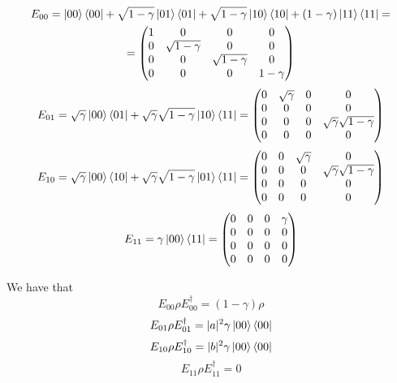 \documentclass{masterthesis}
\begin{document}
\begin{multline}\label{eq:op-el-1}
    E_{00} = \ket{00}\bra{00} + \sqrt{1-\gamma}\ket{01}\bra{01} + \sqrt{1-\gamma}\ket{10}\bra{10} + (1-\gamma)\ket{11}\bra{11} = \\
    = \begin{pmatrix} 1 & 0 & 0 & 0 \\ 0 & \sqrt{1-\gamma} & 0 & 0 \\ 0 & 0 & \sqrt{1-\gamma} & 0 \\ 0 & 0 & 0 & 1-\gamma \end{pmatrix}
\end{multline}
\begin{equation}\label{eq:op-el-2}
    E_{01} = \sqrt{\gamma}\ket{00}\bra{01} + \sqrt{\gamma}\sqrt{1-\gamma}\ket{10}\bra{11}
    = \begin{pmatrix} 0 & \sqrt{\gamma} & 0 & 0 \\ 0 & 0 & 0 & 0 \\ 0 & 0 & 0 & \sqrt{\gamma}\sqrt{1-\gamma} \\ 0 & 0 & 0 & 0 \end{pmatrix}
\end{equation}
\begin{equation}\label{eq:op-el-3}
    E_{10} = \sqrt{\gamma}\ket{00}\bra{10} + \sqrt{\gamma}\sqrt{1-\gamma}\ket{01}\bra{11}  
    = \begin{pmatrix} 0 & 0 & \sqrt{\gamma} & 0 \\ 0 & 0 & 0 & \sqrt{\gamma}\sqrt{1-\gamma} \\ 0 & 0 & 0 & 0 \\ 0 & 0 & 0 & 0 \end{pmatrix}
\end{equation}
\begin{equation}\label{eq:op-el-4}
    E_{11} = \gamma \ket{00}\bra{11}
    = \begin{pmatrix} 0 & 0 & 0 & \gamma \\ 0 & 0 & 0 & 0 \\ 0 & 0 & 0 & 0 \\ 0 & 0 & 0 & 0 \end{pmatrix}
\end{equation}

We have that
\begin{equation}
    E_{00} \rho E_{00}^{\dagger} = (1-\gamma) \rho
\end{equation}
\begin{equation}
    E_{01} \rho E_{01}^{\dagger} = |a|^2 \gamma \ket{00}\bra{00}
\end{equation}
\begin{equation}
    E_{10} \rho E_{10}^{\dagger} = |b|^2 \gamma \ket{00}\bra{00}
\end{equation}
\begin{equation}
    E_{11} \rho E_{11}^{\dagger} = 0
\end{equation}
\end{document}
